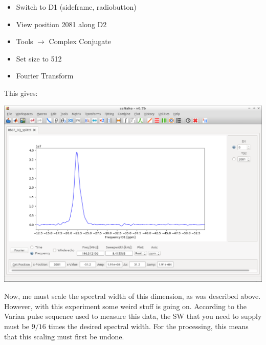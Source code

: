 \documentclass[11pt,a4paper]{article}
\begin{document}
\begin{itemize}
	\item Switch to D1 (sideframe, radiobutton)
	\item View position 2081 along D2
	\item Tools $\longrightarrow$  Complex Conjugate
	\item Set size to 512
	\item Fourier Transform
\end{itemize}
This gives:
\begin{center}
\includegraphics[width=0.8\linewidth]{Figs/Fig10.png}
\end{center}

Now, me must scale the spectral width of this dimension, as was described above. However, with this
experiment some weird stuff is going on. According to the Varian pulse sequence used to measure this
data, the SW that you need to supply must be $9/16$ times the desired spectral width. For the
processing, this means that this scaling must first be undone.
\end{document}
